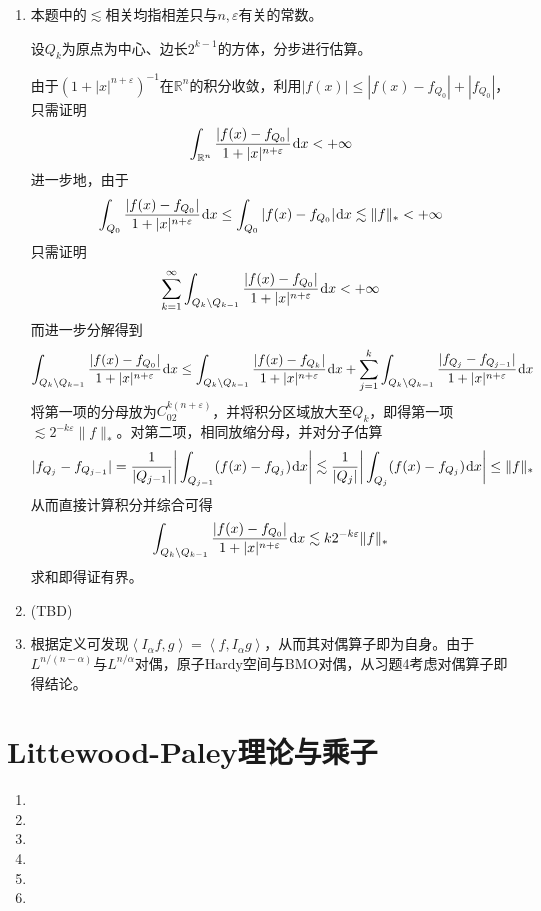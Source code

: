 \documentclass[a4paper,UTF8,fontset=windows]{ctexart}
\newcommand*{\dr}{\hspace{0.07em}\mathrm{d}}
\begin{document}
\begin{enumerate}
    \item 本题中的$\lesssim$相关均指相差只与$n,\varepsilon$有关的常数。
    
    设$Q_k$为原点为中心、边长$2^{k-1}$的方体，分步进行估算。
    
    由于$(1+|x|^{n+\varepsilon})^{-1}$在$\mathbb{R}^n$的积分收敛，利用$|f(x)|\le|f(x)-f_{Q_0}|+|f_{Q_0}|$，只需证明
    $$\int_{\mathbb{R}^n}\frac{|f(x)-f_{Q_0}|}{1+|x|^{n+\varepsilon}}\dr x<+\infty$$
    进一步地，由于
    $$\int_{Q_0}\frac{|f(x)-f_{Q_0}|}{1+|x|^{n+\varepsilon}}\dr x\le\int_{Q_0}|f(x)-f_{Q_0}|\dr x\lesssim\|f\|_*<+\infty$$
    只需证明
    $$\sum_{k=1}^\infty\int_{Q_k\backslash Q_{k-1}}\frac{|f(x)-f_{Q_0}|}{1+|x|^{n+\varepsilon}}\dr x<+\infty$$
    而进一步分解得到
    $$\int_{Q_k\backslash Q_{k-1}}\frac{|f(x)-f_{Q_0}|}{1+|x|^{n+\varepsilon}}\dr x\le\int_{Q_k\backslash Q_{k-1}}\frac{|f(x)-f_{Q_k}|}{1+|x|^{n+\varepsilon}}\dr x+\sum_{j=1}^k\int_{Q_k\backslash Q_{k-1}}\frac{|f_{Q_j}-f_{Q_{j-1}}|}{1+|x|^{n+\varepsilon}}\dr x$$
    将第一项的分母放为$C_02^{k(n+\varepsilon)}$，并将积分区域放大至$Q_k$，即得第一项$\lesssim 2^{-k\varepsilon}\|f\|_*$。对第二项，相同放缩分母，并对分子估算
    $$|f_{Q_j}-f_{Q_{j-1}}|=\frac{1}{|Q_{j-1}|}\bigg|\int_{Q_{j-1}}(f(x)-f_{Q_j})\dr x\bigg|\lesssim\frac{1}{|Q_j|}\bigg|\int_{Q_j}(f(x)-f_{Q_j})\dr x\bigg|\le\|f\|_*$$
    从而直接计算积分并综合可得
    $$\int_{Q_k\backslash Q_{k-1}}\frac{|f(x)-f_{Q_0}|}{1+|x|^{n+\varepsilon}}\dr x\lesssim k2^{-k\varepsilon}\|f\|_*$$
    求和即得证有界。

    \item (TBD)
    \item 根据定义可发现$\left<I_\alpha f,g\right>=\left<f,I_\alpha g\right>$，从而其对偶算子即为自身。由于$L^{n/(n-\alpha)}$与$L^{n/\alpha}$对偶，原子Hardy空间与BMO对偶，从习题4考虑对偶算子即得结论。
\end{enumerate}

\section{Littewood-Paley理论与乘子}
\begin{enumerate}
    \item 
    \item 
    \item 
    \item 
    \item 
    \item 
\end{enumerate}
\end{document}

